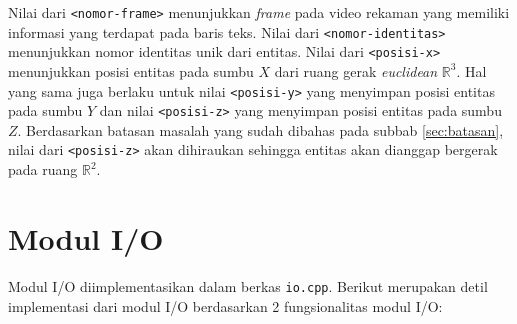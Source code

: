 Nilai dari \texttt{<nomor-frame>} menunjukkan \textit{frame} pada video rekaman yang memiliki informasi yang terdapat pada baris teks. Nilai dari \texttt{<nomor-identitas>} menunjukkan nomor identitas unik dari entitas. Nilai dari \texttt{<posisi-x>} menunjukkan posisi entitas pada sumbu $X$ dari ruang gerak \textit{euclidean} $\mathbb{R}^3$. Hal yang sama juga berlaku untuk nilai \texttt{<posisi-y>} yang menyimpan posisi entitas pada sumbu $Y$ dan nilai \texttt{<posisi-z>} yang menyimpan posisi entitas pada sumbu $Z$. Berdasarkan batasan masalah yang sudah dibahas pada subbab \ref{sec:batasan}, nilai dari \texttt{<posisi-z>} akan dihiraukan sehingga entitas akan dianggap bergerak pada ruang $\mathbb{R}^2$.

\section{Modul I/O}
\label{sec:impl-io}

Modul I/O diimplementasikan dalam berkas \texttt{io.cpp}. Berikut merupakan detil implementasi dari modul I/O berdasarkan 2 fungsionalitas modul I/O:


